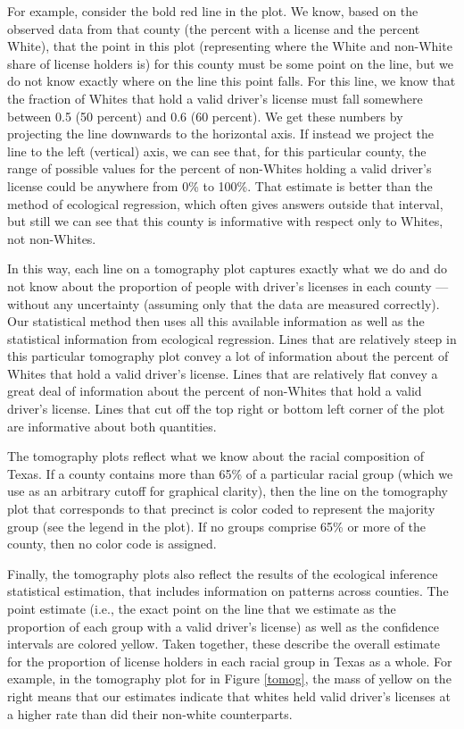 \documentclass[12pt]{article}
\begin{document}
For example, consider the bold red line in the plot. We know, based
on the observed data from that county (the percent with a license and the
percent White), that the point in this plot (representing where the
White and non-White share of license holders is) for this county must be some
point on the line, but we do not know exactly where on the line this
point falls. For this line, we know that the fraction of Whites that
hold a valid driver's license must fall somewhere between 0.5 (50
percent) and 0.6 (60 percent). We get these numbers by projecting the
line downwards to the horizontal axis. If instead we project the line
to the left (vertical) axis, we can see that, for this particular
county, the range of possible values for the percent of non-Whites
holding a valid driver's license could be anywhere from 0\% to 100\%.
That estimate is better than the method of ecological regression,
which often gives answers outside that interval, but still we can see
that this county is informative with respect only to Whites, not
non-Whites. 

In this way, each line on a tomography plot captures exactly what we
do and do not know about the proportion of people with driver's licenses in each county ---
without any uncertainty (assuming only that the data are measured
correctly). Our statistical method then uses all this available
information as well as the statistical information from ecological
regression. Lines that are relatively steep in this particular
tomography plot convey a lot of information about the percent of
Whites that hold a valid driver's license.  Lines that are
relatively flat convey a great deal of information about the percent
of non-Whites that hold a valid driver's license.  Lines that cut off
the top right or bottom left corner of the plot are informative about
both quantities.

The tomography plots reflect what we know about the racial composition
of Texas. If a county contains more than 65\% of a
particular racial group (which we use as an arbitrary cutoff for
graphical clarity), then the line on the tomography plot that
corresponds to that precinct is color coded to represent the majority
group (see the legend in the plot). If no groups comprise 65\% or more
of the county, then no color code is assigned.  

Finally, the tomography plots also reflect the results of the
ecological inference statistical estimation, that includes information
on patterns across counties. The point estimate (i.e., the exact
point on the line that we estimate as the proportion of each group with a valid driver's license)
as well as the confidence intervals are colored yellow.  Taken
together, these describe the overall estimate for the proportion of license holders in
each racial group in Texas as a whole. For example, in the tomography plot
for in Figure \ref{tomog}, the mass of yellow on the right means that our
estimates indicate that whites held valid driver's licenses at a higher rate than did their
non-white counterparts.  
\end{document}
